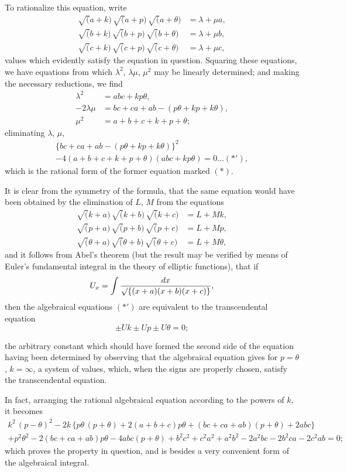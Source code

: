 \documentclass[11pt]{article}
\begin{document}
To rationalize this equation, write
\begin{align*}
\surd(a+k)\,\surd(a+p)\,\surd(a+\theta) &= \lambda + \mu a,\\
\surd(b+k)\,\surd(b+p)\,\surd(b+\theta) &= \lambda + \mu b,\\
\surd(c+k)\,\surd(c+p)\,\surd(c+\theta) &= \lambda + \mu c,
\end{align*}
values which evidently satisfy the equation in question. Squaring these equations, we have equations from which $\lambda^2$, $\lambda\mu$, $\mu^2$ may be linearly determined; and making the necessary reductions, we find
\begin{align*}
\lambda^2 &= abc + kp\theta,\\
-2\lambda\mu &= bc+ca+ab-(p\theta+kp+k\theta),\\
\mu^2 &= a+b+c+k+p+\theta;
\end{align*}
eliminating $\lambda$, $\mu$,
\begin{multline*}
\{bc+ca+ab-(p\theta+kp+k\theta)\}^2\\
- 4(a+b+c+k+p+\theta)(abc+kp\theta) = 0\ldots(*'),
\end{multline*}
which is the rational form of the former equation marked $(*)$.

It is clear from the symmetry of the formula, that the same equation would have been obtained by the elimination of $L$, $M$ from the equations
\begin{align*}
\surd(k+a)\,\surd(k+b)\,\surd(k+c) &= L + Mk,\\
\surd(p+a)\,\surd(p+b)\,\surd(p+c) &= L + Mp,\\
\surd(\theta+a)\,\surd(\theta+b)\,\surd(\theta+c) &= L + M\theta,
\end{align*}
and it follows from Abel's theorem (but the result may be verified by means of Euler's fundamental integral in the theory of elliptic functions), that if
\[
U_x = \int \frac{dx}{\surd\{(x+a)(x+b)(x+c)\}},
\]
then the algebraical equations $(*')$ are equivalent to the transcendental equation
\[
\pm Uk \pm Up \pm U\theta = 0;
\]

\newpage
\setcounter{page}{55}

the arbitrary constant which should have formed the second side of the equation having been determined by observing that the algebraical equation gives for $p=\theta$, $k=\infty$, a system of values, which, when the signs are properly chosen, satisfy the transcendental equation.

In fact, arranging the rational algebraical equation according to the powers of $k$, it becomes
\begin{multline*}
k^2\,(p-\theta)^2 - 2k\,\{p\theta\,(p+\theta) + 2(a+b+c)p\theta + (bc+ca+ab)(p+\theta) + 2abc\}\\
+ p^2\theta^2 - 2(bc+ca+ab)p\theta - 4abc(p+\theta) + b^2c^2 + c^2a^2 + a^2b^2 - 2a^2bc - 2b^2ca - 2c^2ab = 0;
\end{multline*}
which proves the property in question, and is besides a very convenient form of the algebraical integral.
\end{document}
